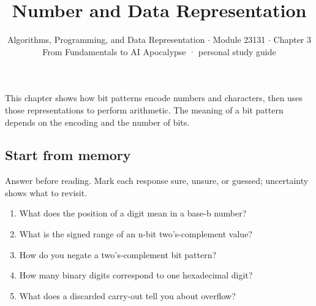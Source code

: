 \documentclass[11pt]{article}
\title{\sffamily\bfseries\color{FAUblue}Number and Data Representation}
\author{Algorithms, Programming, and Data Representation \ensuremath{\cdot} Module 23131 \ensuremath{\cdot} Chapter 3\\[2pt]\small From Fundamentals to AI Apocalypse · personal study guide}
\date{}
\begin{document}
\maketitle
\begingroup\footnotesize\setlength{\parskip}{0pt}\tableofcontents\endgroup
\clearpage

{\large This chapter shows how bit patterns encode numbers and characters, then uses those representations to perform arithmetic. The meaning of a bit pattern depends on the encoding and the number of bits.}


\begin{keepsection}
\section{Start from memory}

Answer before reading. Mark each response sure, unsure, or guessed; uncertainty shows what to revisit.

\begin{enumerate}
\item What does the position of a digit mean in a base-b number?
\item What is the signed range of an n-bit two’s-complement value?
\item How do you negate a two’s-complement bit pattern?
\item How many binary digits correspond to one hexadecimal digit?
\item What does a discarded carry-out tell you about overflow?
\end{enumerate}

\end{keepsection}
\end{document}
